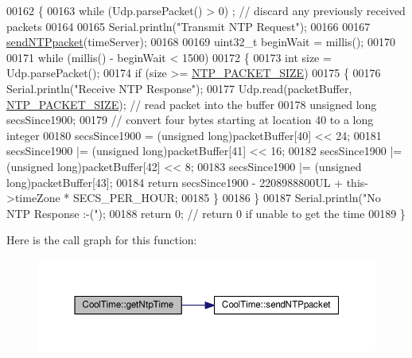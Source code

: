 \begin{DoxyCode}
00162 \{
00163     \textcolor{keywordflow}{while} (Udp.parsePacket() > 0) ; \textcolor{comment}{// discard any previously received packets}
00164     
00165     Serial.println(\textcolor{stringliteral}{"Transmit NTP Request"});
00166 
00167     \hyperlink{class_cool_time_a236a38d120dc53bc67456d763838c5a1}{sendNTPpacket}(timeServer);
00168 
00169     uint32\_t beginWait = millis();
00170 
00171     \textcolor{keywordflow}{while} (millis() - beginWait < 1500) 
00172     \{
00173         \textcolor{keywordtype}{int} size = Udp.parsePacket();
00174         \textcolor{keywordflow}{if} (size >= \hyperlink{_cool_time_8h_a56a6ea64006651b4f42adf713e244f06}{NTP\_PACKET\_SIZE}) 
00175         \{
00176             Serial.println(\textcolor{stringliteral}{"Receive NTP Response"});
00177             Udp.read(packetBuffer, \hyperlink{_cool_time_8h_a56a6ea64006651b4f42adf713e244f06}{NTP\_PACKET\_SIZE});  \textcolor{comment}{// read packet into the buffer}
00178             \textcolor{keywordtype}{unsigned} \textcolor{keywordtype}{long} secsSince1900;
00179             \textcolor{comment}{// convert four bytes starting at location 40 to a long integer}
00180             secsSince1900 =  (\textcolor{keywordtype}{unsigned} long)packetBuffer[40] << 24;
00181             secsSince1900 |= (\textcolor{keywordtype}{unsigned} long)packetBuffer[41] << 16;
00182             secsSince1900 |= (\textcolor{keywordtype}{unsigned} long)packetBuffer[42] << 8;
00183             secsSince1900 |= (\textcolor{keywordtype}{unsigned} long)packetBuffer[43];
00184             \textcolor{keywordflow}{return} secsSince1900 - 2208988800UL + this->timeZone * SECS\_PER\_HOUR;
00185         \}
00186     \}
00187     Serial.println(\textcolor{stringliteral}{"No NTP Response :-("});
00188     \textcolor{keywordflow}{return} 0; \textcolor{comment}{// return 0 if unable to get the time}
00189 \}
\end{DoxyCode}
Here is the call graph for this function\+:
\nopagebreak
\begin{figure}[H]
\begin{center}
\leavevmode
\includegraphics[width=350pt]{class_cool_time_a41fbbbfd651c2079f54d4b2911e4c705_cgraph}
\end{center}
\end{figure}
